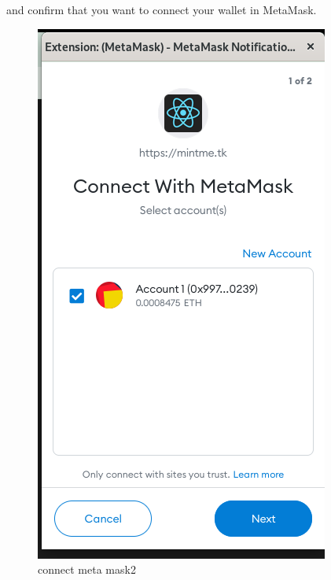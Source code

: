 \documentclass[
]{article}
\begin{document}
and confirm that you want to connect your wallet in MetaMask.

\begin{figure}
\centering
\includegraphics{images/metamask_wallet_connection.png}
\caption{connect meta mask2}
\end{figure}\newpage
\end{document}
